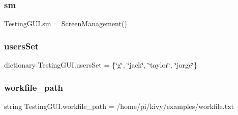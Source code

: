 \subsubsection{\texorpdfstring{sm}{sm}}
{\footnotesize\ttfamily Testing\+G\+U\+I.\+sm = \hyperlink{classTestingGUI_1_1ScreenManagement}{Screen\+Management}()}

\mbox{\label{namespaceTestingGUI_a4a1b5baf3d7390a99be46eacbe5c323f}} 
\subsubsection{\texorpdfstring{users\+Set}{usersSet}}
{\footnotesize\ttfamily dictionary Testing\+G\+U\+I.\+users\+Set = \{\char`\"{}g\char`\"{}, \char`\"{}jack\char`\"{}, \char`\"{}taylor\char`\"{}, \char`\"{}jorge\char`\"{}\}}

\mbox{\label{namespaceTestingGUI_a11c4b70f772a0a449cd7b0dabf533848}} 
\subsubsection{\texorpdfstring{workfile\+\_\+path}{workfile\_path}}
{\footnotesize\ttfamily string Testing\+G\+U\+I.\+workfile\+\_\+path = \textquotesingle{}/home/pi/kivy/examples/workfile.\+txt\textquotesingle{}}

